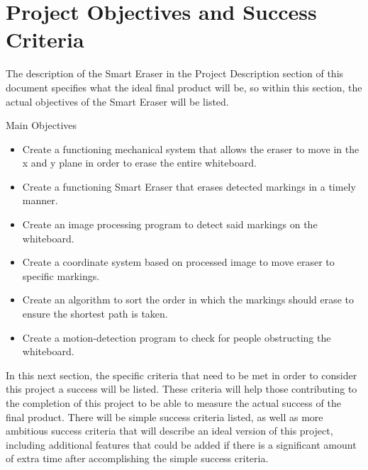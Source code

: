 \section{Project Objectives and Success Criteria}
 The description of the Smart Eraser in the Project Description section of this document specifies what the ideal final product will be, so within this section, the actual objectives of the Smart Eraser will be listed. \\ \par
 \setlength{\parindent}{2.5ex}  Main Objectives
 \begin{itemize}
 \item Create a functioning mechanical system that allows the eraser to move in the x and y plane in order to erase the entire whiteboard.
 \item Create a functioning Smart Eraser that erases detected markings in a timely manner.
 \item Create an image processing program to detect said markings on the whiteboard.
 \item Create a coordinate system based on processed image to move eraser to specific markings.
 \item Create an algorithm to sort the order in which the markings should erase to ensure the shortest path is taken.
 \item Create a motion-detection program to check for people obstructing the whiteboard. \\
 \end{itemize} \par

\setlength{\parindent}{2.5ex} In this next section, the specific criteria that need to be met in order to consider this project a success will be listed. These criteria will help those contributing to the completion of this project to be able to measure the actual success of the final product. There will be simple success criteria listed, as well as more ambitious success criteria that will describe an ideal version of this project, including additional features that could be added if there is a significant amount of extra time after accomplishing the simple success criteria. \\


